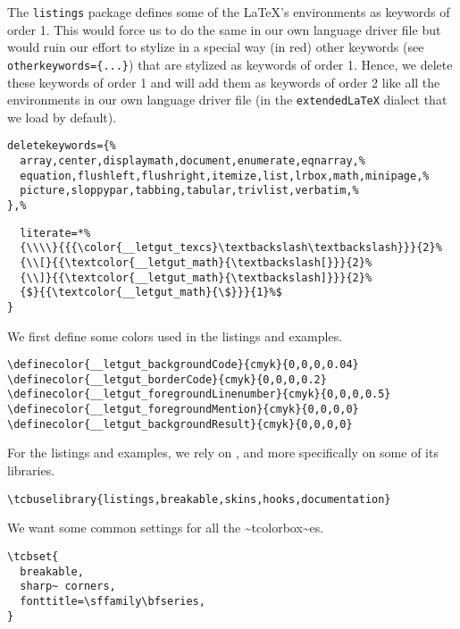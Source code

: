 \documentclass{letgut}
\begin{document}
The \lstinline+listings+ package defines some of the LaTeX's environments as keywords of
order 1. This would force us to do the same in our own language driver file but
would ruin our effort to stylize in a special way (in red) other keywords (see
\lstinline+otherkeywords={...}+) that are stylized as keywords of order 1. Hence, we
delete these keywords of order 1 and will add them as keywords of order 2 like
all the environments in our own language driver file (in the \lstinline+extendedLaTeX+ dialect
that we load by default).

\begin{lstlisting}
deletekeywords={%
  array,center,displaymath,document,enumerate,eqnarray,%
  equation,flushleft,flushright,itemize,list,lrbox,math,minipage,%
  picture,sloppypar,tabbing,tabular,trivlist,verbatim,%
},%
\end{lstlisting}

\begin{lstlisting}
  literate=*%
  {\\\\}{{{\color{__letgut_texcs}\textbackslash\textbackslash}}}{2}%
  {\\[}{{\textcolor{__letgut_math}{\textbackslash[}}}{2}%
  {\\]}{{\textcolor{__letgut_math}{\textbackslash]}}}{2}%
  {$}{{\textcolor{__letgut_math}{\$}}}{1}%$
}
\end{lstlisting}

We first define some colors used in the listings and examples.

\begin{lstlisting}
\definecolor{__letgut_backgroundCode}{cmyk}{0,0,0,0.04}
\definecolor{__letgut_borderCode}{cmyk}{0,0,0,0.2}
\definecolor{__letgut_foregroundLinenumber}{cmyk}{0,0,0,0.5}
\definecolor{__letgut_foregroundMention}{cmyk}{0,0,0,0}
\definecolor{__letgut_backgroundResult}{cmyk}{0,0,0,0}
\end{lstlisting}

For the listings and examples, we rely on , and more
specifically on some of its libraries.

\begin{lstlisting}
\tcbuselibrary{listings,breakable,skins,hooks,documentation}
\end{lstlisting}

We want some common settings for all the \textasciitilde{}tcolorbox\textasciitilde{}es.

\begin{lstlisting}
\tcbset{
  breakable,
  sharp~ corners,
  fonttitle=\sffamily\bfseries,
}
\end{lstlisting}
\end{document}

